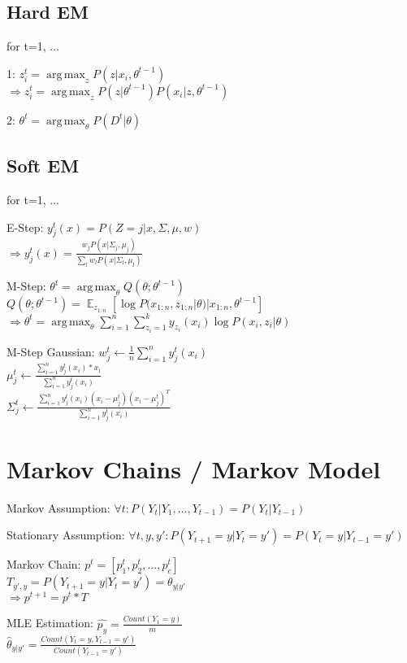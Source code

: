 \documentclass[a4paper, 11pt, landscape]{article}
\DeclareMathOperator*{\E}{\mathbb{E}}
\DeclareMathOperator*{\argmax}{arg\,max}
\begin{document}
\begin{multicols*}{3}
		\subsection{Hard EM}
		\begin{compactdesc}
			\item[for t=1, ...]
			\item[1:] $z_i^t = \argmax_z P(z|x_i, \theta^{t-1}) $\\
			$ \Rightarrow z_i^t = \argmax_z P(z|\theta^{t-1})P(x_i|z,\theta^{t-1}) $
			\item[2:] $\theta^t = \argmax_\theta P(D^t|\theta)$
		\end{compactdesc}
		
		\subsection{Soft  EM}
		\begin{compactdesc}
			\item[for t=1, ...]
			\item[E-Step:] $y_j^t(x) = P(Z=j | x, \Sigma, \mu, w)$\\
			$\Rightarrow y_j^t(x) = \frac{w_jP(x|\Sigma_j, \mu_j)}{\sum_l w_lP(x|\Sigma_l, \mu_l)}$
			\item[M-Step:] $\theta^t = \argmax_\theta Q(\theta;\theta^{t-1})$\\
			$Q(\theta;\theta^{t-1}) = \E_{z_{1:n}}[\log P(x_{1:n}, z_{1:n}| \theta)|x_{1:n}, \theta^{t-1}]$\\
			$\Rightarrow \theta^t = \argmax_\theta \sum_{i=1}^{n} \sum_{z_i=1}^{k} y_{z_i}(x_i) \log P(x_i, z_i | \theta)$
			\item[M-Step Gaussian:] $w_j^t \leftarrow \frac{1}{n} \sum_{i=1}^{n}y_j^t(x_i)$\\
			$\mu_j^t \leftarrow \frac{\sum_{i=1}^{n} y_j^t(x_i)*x_i}{\sum_{i=1}^{n}y_j^t(x_i)}$\\
			$\Sigma_j^t \leftarrow \frac{\sum_{i=1}^{n}y_j^t(x_i)(x_i-\mu_j^t)(x_i-\mu_j^t)^T}{\sum_{i=1}^{n}y_j^t(x_i)}$
		\end{compactdesc}
		\section{Markov Chains / Markov Model}
		\begin{compactdesc}
			\item[Markov Assumption:] $\forall t: P(Y_t | Y_1, ..., Y_{t-1}) = P(Y_t|Y_{t-1})$
			\item[Stationary Assumption:] $\forall t,y,y': P(Y_{t+1} = y | Y_t = y') = P(Y_t = y | Y_{t-1} = y')$
			\item[Markov Chain:] $p^t = [p_1^t, p_2^t, ..., p_c^t]$\\
			$T_{y',y} = P(Y_{t+1} = y | Y_t=y') = \theta_{y|y'}$\\
			$\Rightarrow p^{t+1} = p^t*T$
			\item[MLE Estimation:] $\hat{p_y} = \frac{Count(Y_1=y)}{m}$\\
			$\hat{\theta}_{y|y'} = \frac{Count(Y_t = y, Y_{t-1} = y')}{Count(Y_{t-1} = y')}$
			

\end{compactdesc}
\end{multicols*}
\end{document}

